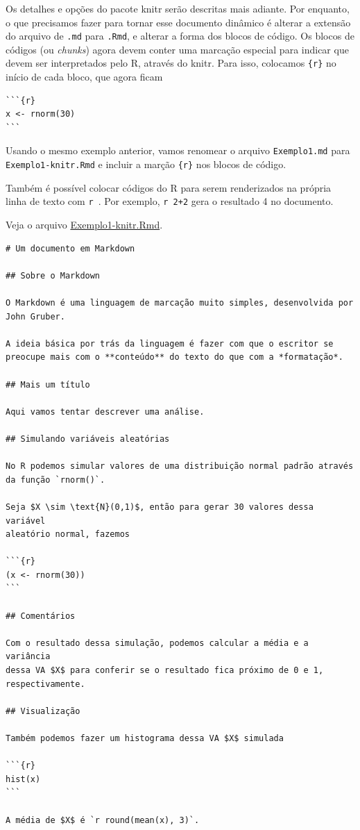 \documentclass[10pt,a4paper]{book}
\begin{document}
Os detalhes e opções do pacote knitr serão descritas mais adiante. Por
enquanto, o que precisamos fazer para tornar esse documento dinâmico é
alterar a extensão do arquivo de \texttt{.md} para \texttt{.Rmd}, e
alterar a forma dos blocos de código. Os blocos de códigos (ou
\emph{chunks}) agora devem conter uma marcação especial para indicar que
devem ser interpretados pelo R, através do knitr. Para isso, colocamos
\texttt{\{r\}} no início de cada bloco, que agora ficam

\begin{verbatim}
```{r}
x <- rnorm(30)
```
\end{verbatim}

Usando o mesmo exemplo anterior, vamos renomear o arquivo
\texttt{Exemplo1.md} para \texttt{Exemplo1-knitr.Rmd} e incluir a marção
\texttt{\{r\}} nos blocos de código.

Também é possível colocar códigos do R para serem renderizados na
própria linha de texto com
\texttt{\textasciigrave{}r\ \textasciigrave{}}. Por exemplo,
\texttt{\textasciigrave{}r\ 2+2\textasciigrave{}} gera o resultado 4 no
documento.

Veja o arquivo \href{exemplos/Exemplo1-knitr.Rmd}{Exemplo1-knitr.Rmd}.

\begin{verbatim}
# Um documento em Markdown

## Sobre o Markdown

O Markdown é uma linguagem de marcação muito simples, desenvolvida por
John Gruber.

A ideia básica por trás da linguagem é fazer com que o escritor se
preocupe mais com o **conteúdo** do texto do que com a *formatação*.

## Mais um título

Aqui vamos tentar descrever uma análise.

## Simulando variáveis aleatórias

No R podemos simular valores de uma distribuição normal padrão através
da função `rnorm()`.

Seja $X \sim \text{N}(0,1)$, então para gerar 30 valores dessa variável
aleatório normal, fazemos

```{r}
(x <- rnorm(30))
```

## Comentários

Com o resultado dessa simulação, podemos calcular a média e a variância
dessa VA $X$ para conferir se o resultado fica próximo de 0 e 1,
respectivamente.

## Visualização

Também podemos fazer um histograma dessa VA $X$ simulada

```{r}
hist(x)
```

A média de $X$ é `r round(mean(x), 3)`.
\end{verbatim}
\end{document}
